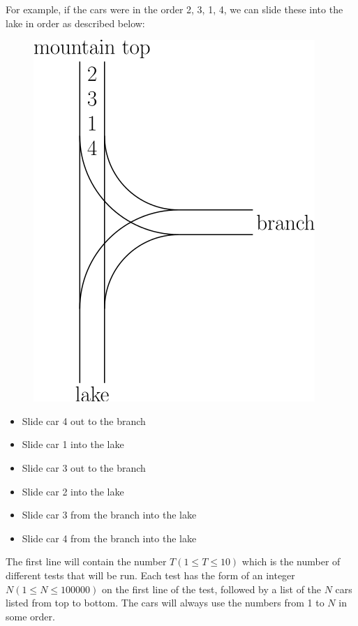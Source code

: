 \documentclass{contest-set}
\begin{document}
For example, if the cars were in the order 2, 3, 1, 4, we can slide these into the lake in order as described below:

\begin{figure}[h]
    \centering
    \includegraphics[scale=0.5]{the-candy-mountain-2}
\end{figure}

\begin{itemize}
    \item Slide car 4 out to the branch
    \item Slide car 1 into the lake
    \item Slide car 3 out to the branch
    \item Slide car 2 into the lake
    \item Slide car 3 from the branch into the lake
    \item Slide car 4 from the branch into the lake
\end{itemize}

The first line will contain the number $T (1 \leq T \leq 10)$ which is the number of different tests that will be run. Each test has the form of an integer $N (1 \leq N \leq 100000)$ on the first line of the test, followed by a list of the $N$ cars listed from top to bottom. The cars will always use the numbers from 1 to $N$ in some order.
\end{document}
